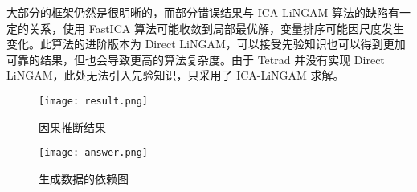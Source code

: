     大部分的框架仍然是很明晰的，而部分错误结果与 ICA-LiNGAM 算法的缺陷有一定的关系，使用 FastICA 算法可能收敛到局部最优解，变量排序可能因尺度发生变化。此算法的进阶版本为 Direct LiNGAM，可以接受先验知识也可以得到更加可靠的结果，但也会导致更高的算法复杂度。由于 Tetrad 并没有实现 Direct LiNGAM，此处无法引入先验知识，只采用了 ICA-LiNGAM 求解。

    \begin{figure}[ht]
        \centering
        \texttt{[image: result.png]}
        \caption{因果推断结果}\label{fig:result}
    \end{figure}

   
    \begin{figure}[ht]
        \centering
        \texttt{[image: answer.png]}
        \caption{生成数据的依赖图}\label{fig:answer}
    \end{figure}

    

